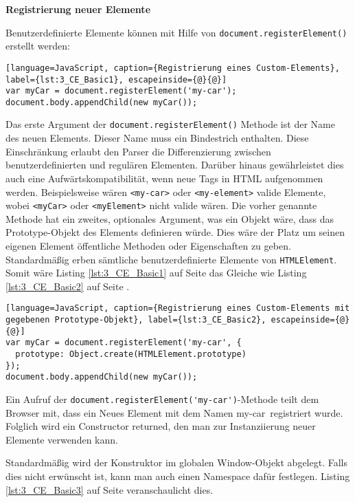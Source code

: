 \textbf{Registrierung neuer Elemente}

Benutzerdefinierte Elemente können mit Hilfe von \lstinline|document.registerElement()| erstellt werden:

\begin{lstlisting}[language=JavaScript, caption={Registrierung eines Custom-Elements}, label={lst:3_CE_Basic1}, escapeinside={@}{@}]
var myCar = document.registerElement('my-car');
document.body.appendChild(new myCar());
\end{lstlisting}

Das erste Argument der \lstinline|document.registerElement()| Methode ist der Name des neuen Elements. Dieser Name muss ein Bindestrich enthalten. Diese Einschränkung erlaubt den Parser die Differenzierung zwischen benutzerdefinierten und regulären Elementen. Darüber hinaus gewährleistet dies auch eine Aufwärtskompatibilität, wenn neue Tags in HTML aufgenommen werden. Beispielsweise wären \lstinline|<my-car>| oder \lstinline|<my-element>| valide Elemente, wobei \lstinline|<myCar>| oder \lstinline|<myElement>| nicht valide wären. Die vorher genannte Methode hat ein zweites, optionales Argument, was ein Objekt wäre, dass das Prototype-Objekt des Elements definieren würde. Dies wäre der Platz um seinen eigenen Element öffentliche Methoden oder Eigenschaften zu geben. Standardmäßig erben sämtliche benutzerdefinierte Elemente von \lstinline|HTMLElement|. Somit wäre Listing \ref{lst:3_CE_Basic1} auf Seite \pageref{lst:3_CE_Basic1} das Gleiche wie Listing \ref{lst:3_CE_Basic2} auf Seite \pageref{lst:3_CE_Basic2}.

\begin{lstlisting}[language=JavaScript, caption={Registrierung eines Custom-Elements mit gegebenen Prototype-Objekt}, label={lst:3_CE_Basic2}, escapeinside={@}{@}]
var myCar = document.registerElement('my-car', {
  prototype: Object.create(HTMLElement.prototype)
});
document.body.appendChild(new myCar());
\end{lstlisting}

Ein Aufruf der \lstinline|document.registerElement('my-car')|-Methode teilt dem Browser mit, dass ein Neues Element mit dem Namen \glqq my-car\grqq\ registriert wurde. Folglich wird ein Constructor returned, den man zur Instanziierung neuer Elemente verwenden kann.

Standardmäßig wird der Konstruktor im globalen Window-Objekt abgelegt. Falls dies nicht erwünscht ist, kann man auch einen Namespace dafür festlegen. Listing \ref{lst:3_CE_Basic3} auf Seite \pageref{lst:3_CE_Basic3} veranschaulicht dies.

